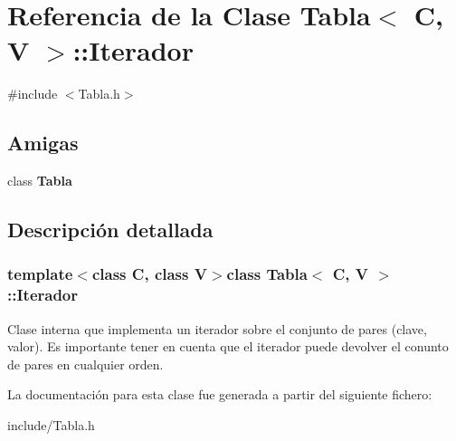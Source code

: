 \hypertarget{class_tabla_1_1_iterador}{
\section{\-Referencia de la \-Clase \-Tabla$<$ \-C, \-V $>$\-:\-:\-Iterador}
\label{class_tabla_1_1_iterador}
}


{\ttfamily \#include $<$\-Tabla.\-h$>$}

\subsection*{\-Amigas}
\begin{DoxyCompactItemize}
\item 
\hypertarget{class_tabla_1_1_iterador_a172484163cb8b80140c3053a4c68e4da}{
class {\bfseries \-Tabla}}
\label{class_tabla_1_1_iterador_a172484163cb8b80140c3053a4c68e4da}

\end{DoxyCompactItemize}


\subsection{\-Descripción detallada}
\subsubsection*{template$<$class C, class V$>$class Tabla$<$ C, V $>$\-::\-Iterador}

\-Clase interna que implementa un iterador sobre el conjunto de pares (clave, valor). \-Es importante tener en cuenta que el iterador puede devolver el conunto de pares en cualquier orden. 

\-La documentación para esta clase fue generada a partir del siguiente fichero\-:\begin{DoxyCompactItemize}
\item 
include/\-Tabla.\-h\end{DoxyCompactItemize}
